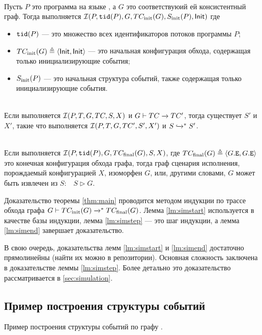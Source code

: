 \begin{lemma}
  \label{lm:simstart}
  \quad\\
  Пусть $P$ это программа на языке \LLANG,
  а $G$ это соответствуюий ей \IMM консистентный граф.
  Тогда выполняется $\mathcal{I}(P, {\mathtt{tid}}(P), G, TC_{\mathrm{init}}({G}), S_{\rm init}(P), {\mathsf{Init}})$ где
  \begin{itemize}
    \item ${\mathtt{tid}}(P)$ --- это множество всех идентификаторов потоков программы $P$;
    \item $TC_{\mathrm{init}}({G}) \triangleq \langle {\mathsf{Init}}, {\mathsf{Init}} \rangle$ --- это начальная конфигурация обхода,
      содержащая только инициализирующие события;
    \item $S_{\rm init}(P)$ --- это начальная структура событий,
      также содержащая только инициализирующие события.
  \end{itemize}
\end{lemma}

\begin{lemma}
  \label{lm:simstep}
  \quad\\
  Если выполняется $\mathcal{I}(P, T, G, TC, S, X)$ и ${G \vdash TC \xrightarrow{} TC'}$,
  тогда существует $S'$ и $X'$, такие что выполняется
  $\mathcal{I}(P, T, G, TC', S', X')$ и $S \xhookrightarrow{}^* S'$.
\end{lemma}

\begin{lemma}
  \label{lm:simend}
  \quad\\
  Если выполняется $\mathcal{I}(P, {\mathtt{tid}}(P), G, TC_{\mathrm{final}}({G}), S, X)$,
  где $TC_{\mathrm{final}}({G}) \triangleq \langle G.{\mathtt{E}}, G.{\mathtt{E}} \rangle$ это конечная
  конфигурация обхода графа, тогда граф сценария исполнения,
  порождаемый конфигурацией $X$, изоморфен $G$,
  или, другими словами, $G$ может быть извлечен из $S$:~~$S \rhd G$.
\end{lemma}

Доказательство теоремы \ref{thm:main}
проводится методом индукции по трассе обхода графа
$G \vdash TC_{\mathrm{init}}({G}) \xrightarrow{}^* TC_{\mathrm{final}}({G})$.
Лемма \ref{lm:simstart} используется в качестве базы индукции,
лемма \ref{lm:simstep} --- это шаг индукции,
а лемма \ref{lm:simend} завершает доказательство.

В свою очередь, доказательства лемм \ref{lm:simstart} и \ref{lm:simend}
достаточно прямолинейны (найти их можно в \coq репозитории).
Основная сложность заключена в доказательстве леммы \ref{lm:simstep}.
Более детально это доказательство рассматривается в \ref{sec:simulation}.


\subsection{Пример построения структуры событий}

Пример построения структуры событий по графу \IMM.

